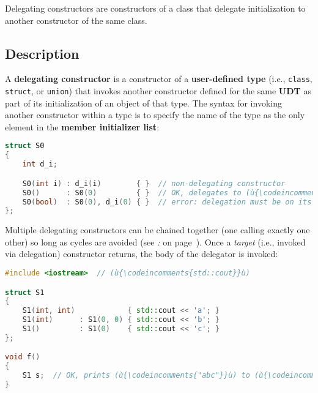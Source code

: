 

Delegating constructors are constructors of a class that delegate initialization to another
constructor of the same class.

\subsection[Description]{Description}\label{description}

A \textbf{delegating constructor} is a constructor of a
\textbf{user-defined type} (i.e., \texttt{class}, \texttt{struct}, or
\texttt{union}) that invokes another constructor defined for the same
\textbf{UDT} as part of its initialization of an object of that type.
The syntax for invoking another constructor within a type is to specify
the name of the type as the only element in the \textbf{member
initializer list}:

\begin{lstlisting}[language=C++]
struct S0
{
    int d_i;

    S0(int i) : d_i(i)        { }  // non-delegating constructor
    S0()      : S0(0)         { }  // OK, delegates to (ù{\codeincomments{S0(int)}}ù)
    S0(bool)  : S0(0), d_i(0) { }  // error: delegation must be on its own
};
\end{lstlisting}
    
\noindent Multiple delegating constructors can be chained together (one calling
exactly one other) so long as cycles are avoided (see
{\it{}:} {\it{}} on page~\pageref{delegation-cycles}). Once a \emph{target} (i.e., invoked via delegation) constructor returns,
the body of the delegator is invoked:

\begin{lstlisting}[language=C++]
#include <iostream>  // (ù{\codeincomments{std::cout}}ù)

struct S1
{
    S1(int, int)            { std::cout << 'a'; }
    S1(int)      : S1(0, 0) { std::cout << 'b'; }
    S1()         : S1(0)    { std::cout << 'c'; }
};

void f()
{
    S1 s;  // OK, prints (ù{\codeincomments{"abc"}}ù) to (ù{\codeincomments{stdout}}ù)
}
\end{lstlisting}
    
